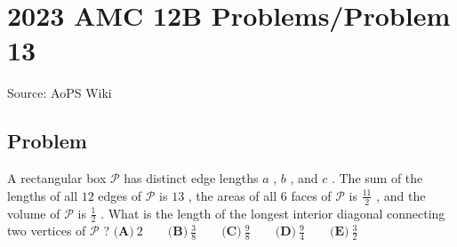 \documentclass[12pt]{article}
\begin{document}
\section*{{2023 AMC 12B Problems/Problem 13}}
Source: AoPS Wiki

\subsection*{Problem}
A rectangular box $\mathcal{P}$ has distinct edge lengths $a$ , $b$ , and $c$ . The sum of the lengths of all $12$ edges of $\mathcal{P}$ is $13$ , the areas of all $6$ faces of $\mathcal{P}$ is $\frac{11}{2}$ , and the volume of $\mathcal{P}$ is $\frac{1}{2}$ . What is the length of the longest interior diagonal connecting two vertices of $\mathcal{P}$ ? $\textbf{(A)}~2\qquad\textbf{(B)}~\frac{3}{8}\qquad\textbf{(C)}~\frac{9}{8}\qquad\textbf{(D)}~\frac{9}{4}\qquad\textbf{(E)}~\frac{3}{2}$
\end{document}
